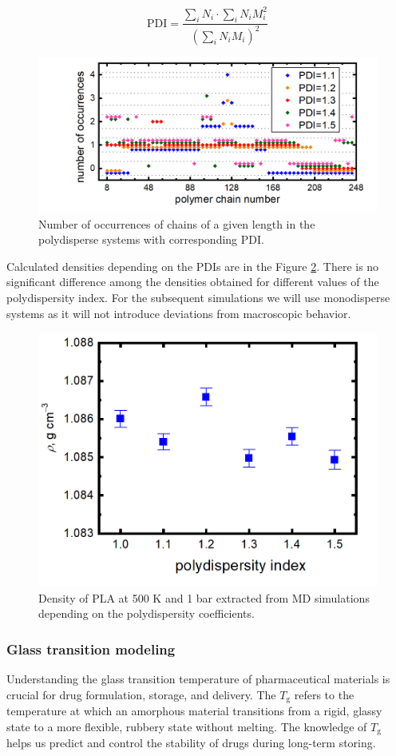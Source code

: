 \begin{equation}
	\text{PDI} = \frac{\sum_{i} N_{i} \cdot \sum_{i} N_{i} M_{i}^2}{\left(\sum_{i} N_{i} M_{i}\right)^2}
	\label{eq:PDI}
\end{equation}


\begin{figure}[htb]
	\centering
	\includegraphics[width=1\hsize]{img/polydispersity_occurences_new.png}
	\caption{Number of occurrences of chains of a given length in the polydisperse systems with corresponding PDI.}
	\label{fig:polydisperzita_vyskyt}
\end{figure}       

Calculated densities depending on the PDIs are in the Figure \ref{fig:polydisperzita}. There is no significant difference among the densities obtained for different values of the polydispersity index. For the subsequent simulations we will use monodisperse systems as it will not introduce deviations from macroscopic behavior. 

\begin{figure}[htb]
	\centering
	\includegraphics[width=0.5\hsize]{img/polydisperzita_new.png}
	\caption{Density of PLA at 500 K and 1 bar extracted from MD simulations depending on the polydispersity coefficients.}
	\label{fig:polydisperzita}
\end{figure}       

\subsubsection{Glass transition modeling}
Understanding the glass transition temperature of pharmaceutical materials is crucial for drug formulation, storage, and delivery. The $T_\text{g}$ refers to the temperature at which an amorphous material transitions from a rigid, glassy state to a more flexible, rubbery state without melting. The knowledge of $T_\text{g}$ helps us predict and control the stability of drugs during long-term storing.  

